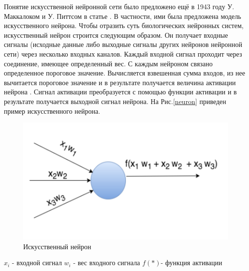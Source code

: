 Понятие искусственной нейронной сети было предложено ещё в 1943 году У. Маккалоком и У. Питтсом в статье \cite{neural_nets}. В частности, ими была предложена модель искусственного нейрона.
Чтобы отразить суть биологических нейронных систем, искусственный нейрон строится следующим образом. Он получает входные сигналы (исходные данные либо выходные сигналы других нейронов нейронной сети) через несколько входных каналов. Каждый входной сигнал проходит через соединение, имеющее определенный вес. С каждым нейроном связано определенное пороговое значение. Вычисляется взвешенная сумма входов, из нее вычитается пороговое значение и в результате получается величина активации нейрона . Сигнал активации преобразуется с помощью функции активации и в результате получается выходной сигнал нейрона.
На Рис.\ref{neuron} приведен пример искусственного нейрона.

\begin{figure}[ht]
    \centering
    \includegraphics [width=\textwidth*2/3] {images/neuron.png}
    \caption{Искусственный нейрон}
    \label{fig:neuron}
\end{figure}

$x_i$ - входной сигнал
$w_i$ - вес входного сигнала $f(*)$- функция активации

